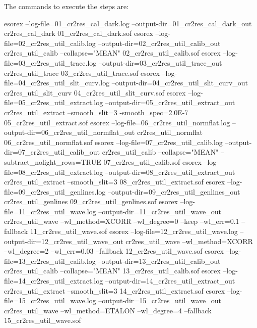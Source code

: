 The commands to execute the steps are:
\begin{shell}[fontsize=\footnotesize]
esorex --log-file=01_cr2res_cal_dark.log --output-dir=01_cr2res_cal_dark_out cr2res_cal_dark 
  01_cr2res_cal_dark.sof
esorex --log-file=02_cr2res_util_calib.log --output-dir=02_cr2res_util_calib_out 
  cr2res_util_calib --collapse="MEAN" 02_cr2res_util_calib.sof
esorex --log-file=03_cr2res_util_trace.log --output-dir=03_cr2res_util_trace_out    
  cr2res_util_trace 03_cr2res_util_trace.sof
esorex --log-file=04_cr2res_util_slit_curv.log --output-dir=04_cr2res_util_slit_curv_out
  cr2res_util_slit_curv 04_cr2res_util_slit_curv.sof
esorex --log-file=05_cr2res_util_extract.log --output-dir=05_cr2res_util_extract_out
  cr2res_util_extract --smooth_slit=3 -smooth_spec=2.0E-7 
  05_cr2res_util_extract.sof
esorex --log-file=06_cr2res_util_normflat.log --output-dir=06_cr2res_util_normflat_out 
  cr2res_util_normflat 06_cr2res_util_normflat.sof
esorex --log-file=07_cr2res_util_calib.log --output-dir=07_cr2res_util_calib_out 
  cr2res_util_calib --collapse="MEAN" --subtract_nolight_rows=TRUE 07_cr2res_util_calib.sof
esorex --log-file=08_cr2res_util_extract.log --output-dir=08_cr2res_util_extract_out  
  cr2res_util_extract --smooth_slit=3  08_cr2res_util_extract.sof
esorex --log-file=09_cr2res_util_genlines.log  --output-dir=09_cr2res_util_genlines_out  
  cr2res_util_genlines 09_cr2res_util_genlines.sof
esorex --log-file=11_cr2res_util_wave.log --output-dir=11_cr2res_util_wave_out 
  cr2res_util_wave --wl_method=XCORR --wl_degree=0 --keep --wl_err=0.1 --fallback 
11_cr2res_util_wave.sof
esorex --log-file=12_cr2res_util_wave.log --output-dir=12_cr2res_util_wave_out 
  cr2res_util_wave --wl_method=XCORR --wl_degree=2 --wl_err=0.03 --fallback 
  12_cr2res_util_wave.sof
esorex --log-file=13_cr2res_util_calib.log --output-dir=13_cr2res_util_calib_out 
  cr2res_util_calib --collapse="MEAN" 13_cr2res_util_calib.sof
esorex --log-file=14_cr2res_util_extract.log --output-dir=14_cr2res_util_extract_out 
  cr2res_util_extract --smooth_slit=3 14_cr2res_util_extract.sof
esorex --log-file=15_cr2res_util_wave.log --output-dir=15_cr2res_util_wave_out 
  cr2res_util_wave --wl_method=ETALON --wl_degree=4 --fallback 15_cr2res_util_wave.sof
\end{shell}


